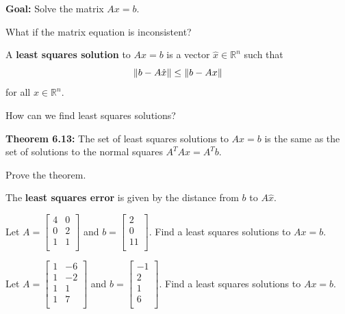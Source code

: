 \newpage


{\bf Goal:} Solve the matrix $Ax=b$.

What if the matrix equation is inconsistent?

\begin{defn} A {\bf least squares solution} to $Ax=b$ is a vector $\hat{x} \in \mathbb{R}^n$ such that $$\left\lVert b-A\hat{x}\right\rVert \leq \left\lVert b-Ax\right\rVert$$ for all $x \in \mathbb{R}^n$.
\end{defn}

How can we find least squares solutions?

{\bf Theorem 6.13:} The set of least squares solutions to $Ax=b$ is the same as the set of solutions to the normal squares $A^{T}Ax=A^{T}b$.

\begin{enumerate}



\Problem Prove the theorem.

\vfill

\newpage

\begin{defn} The {\bf least squares error} is given by the distance from $b$ to $A\hat{x}$.
\end{defn}

\Problem Let $A=\begin{bmatrix} 4 & 0\\ 0 & 2\\ 1 & 1\\ \end{bmatrix}$ and $b=\begin{bmatrix} 2\\ 0\\ 11\\ \end{bmatrix}$. Find a least squares solutions to $Ax=b$.

\vfill

\Problem Let $A=\begin{bmatrix} 1 & -6\\ 1 & -2\\ 1 & 1\\1 & 7\\ \end{bmatrix}$ and $b=\begin{bmatrix} -1\\ 2\\ 1\\ 6\\ \end{bmatrix}$. Find a least squares solutions to $Ax=b$.


\end{enumerate}
